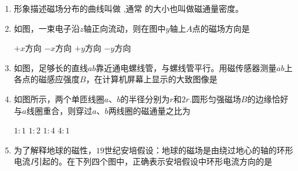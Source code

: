 \begin{enumerate}
\item
{}
形象描述磁场分布的曲线叫做 \underlinegap ,通常 \underlinegap 的大小也叫做磁通量密度。


\item
{}
如图，一束电子沿$ z $轴正向流动，则在图中$ y $轴上$ A $点的磁场方向是  
\begin{figure}[h!]
\centering

\end{figure}


\fourchoices
{$ +x $方向}
{$ -x $方向}
{$ +y $方向}
{$ -y $方向}





\item
{}
如图，足够长的直线$ ab $靠近通电螺线管，与螺线管平行。用磁传感器测量$ ab $上各点的磁感应强度$ B $，在计算机屏幕上显示的大致图像是  
\begin{figure}[h!]
\centering

\end{figure}

\pfourchoices
{}
{}
{}
{}



\item
{}
如图所示，两个单匝线圈$ a $、$ b $的半径分别为$ r $和$ 2r $.圆形匀强磁场$ B $的边缘恰好与$ a $线圈重合，则穿过$ a $、$ b $两线圈的磁通量之比为  
\begin{figure}[h!]
\centering

\end{figure}


\fourchoices
{$ 1:1 $}
{$ 1:2 $ }
{$ 1:4 $}
{$ 4:1 $}







\item
{}
为了解释地球的磁性，$ 19 $世纪安培假设：地球的磁场是由绕过地心的轴的环形电流$ I $引起的。在下列四个图中，正确表示安培假设中环形电流方向的是  

\pfourchoices
{}
{}
{}
{}






\end{enumerate}
